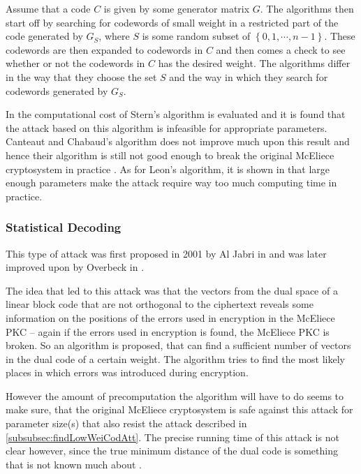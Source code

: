 Assume that a code $C$ is given by some generator matrix $G$. The algorithms then start off by searching for codewords of small weight in a restricted part of the code generated by $G_S$, where $S$ is some random subset of $\left\{ 0, 1, \cdots, n-1 \right\}$. These codewords are then expanded to codewords in $C$ and then comes a check to see whether or not the codewords in $C$ has the desired weight. The algorithms differ in the way that they choose the set $S$ and the way in which they search for codewords generated by $G_S$.

In \cite{CS} the computational cost of Stern's algorithm is evaluated and it is found that the attack based on this algorithm is infeasible for appropriate parameters. Canteaut and Chabaud's algorithm does not improve much upon this result and hence their algorithm is still not good enough to break the original McEliece cryptosystem in practice \cite{EOS}. As for Leon's algorithm, it is shown in \cite{chabaud} that large enough parameters make the attack require way too much computing time in practice.



\subsubsection{Statistical Decoding}
\label{subsubsec:statDec}

This type of attack was first proposed in 2001 by Al Jabri in \cite{aljabri} and was later improved upon by Overbeck in \cite{overbeck}.

The idea that led to this attack was that the vectors from the dual space of a linear block code that are not orthogonal to the ciphertext reveals some information on the positions of the errors used in encryption in the McEliece PKC -- again if the errors used in encryption is found, the McEliece PKC is broken. So an algorithm is proposed, that can find a sufficient number of vectors in the dual code of a certain weight. The algorithm tries to find the most likely places in which errors was introduced during encryption.

However the amount of precomputation the algorithm will have to do seems to make sure, that the original McEliece cryptosystem is safe against this attack for parameter size(s) that also resist the attack described in \cref{subsubsec:findLowWeiCodAtt}. The precise running time of this attack is not clear however, since the true minimum distance of the dual code is something that is not known much about \cite{LDVL}.



